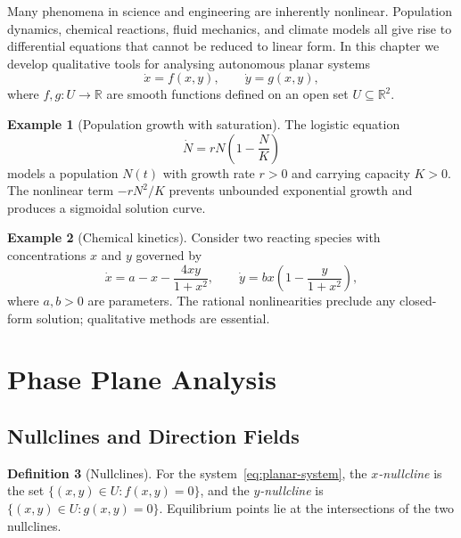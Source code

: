 \documentclass[12pt,a4paper,openany]{book}
\theoremstyle{definition}
\newtheorem{definition}{Definition}[chapter]
\newtheorem{example}[definition]{Example}
\theoremstyle{plain}
\theoremstyle{remark}
\newcommand{\R}{\mathbb{R}}
\begin{document}
Many phenomena in science and engineering are inherently nonlinear.
Population dynamics, chemical reactions, fluid mechanics, and climate
models all give rise to differential equations that cannot be reduced
to linear form. In this chapter we develop qualitative tools for
analysing autonomous planar systems
\begin{equation}\label{eq:planar-system}
  \dot{x} = f(x,y), \qquad \dot{y} = g(x,y),
\end{equation}
where $f,g\colon U\to\R$ are smooth functions defined on an open set
$U\subseteq\R^{2}$.

\begin{example}[Population growth with saturation]
\label{ex:logistic-motivation}
The logistic equation
\[
  \dot{N} = rN\!\left(1-\frac{N}{K}\right)
\]
models a population $N(t)$ with growth rate $r>0$ and carrying
capacity $K>0$. The nonlinear term $-rN^{2}/K$ prevents unbounded
exponential growth and produces a sigmoidal solution curve.
\end{example}

\begin{example}[Chemical kinetics]
\label{ex:chemical-motivation}
Consider two reacting species with concentrations $x$ and $y$ governed
by
\[
  \dot{x} = a - x - \frac{4xy}{1+x^{2}},
  \qquad
  \dot{y} = bx\!\left(1-\frac{y}{1+x^{2}}\right),
\]
where $a,b>0$ are parameters. The rational nonlinearities preclude
any closed-form solution; qualitative methods are essential.
\end{example}

\section{Phase Plane Analysis}
\label{sec:phase-plane}

\subsection{Nullclines and Direction Fields}
\label{subsec:nullclines}

\begin{definition}[Nullclines]
\label{def:nullclines}
For the system~\eqref{eq:planar-system}, the \emph{$x$-nullcline} is
the set $\{(x,y)\in U : f(x,y)=0\}$, and the \emph{$y$-nullcline}
is $\{(x,y)\in U : g(x,y)=0\}$. Equilibrium points lie at the
intersections of the two nullclines.
\end{definition}
\end{document}
